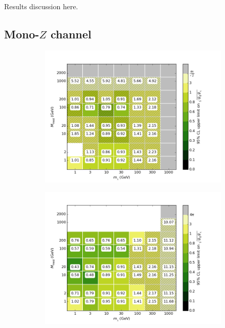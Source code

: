 Results discussion here.

\subsection{Mono-$Z$ channel}

\begin{figure}[h]
  \centering
    \begin{subfigure}[t]{0.45\textwidth}
      \centering
      \includegraphics[width=1.\textwidth]{figures/grid_allpoints_SVD_rat05.png}
      \caption{}
    \end{subfigure}
    \begin{subfigure}[t]{0.45\textwidth}
      \centering
      \includegraphics[width=1.\textwidth]{figures/grid_allpoints_SVD_rat1.png}

\end{subfigure}
\end{figure}
